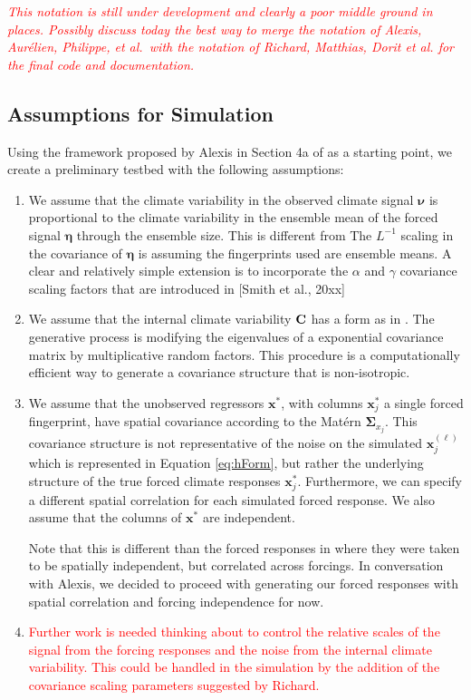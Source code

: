 \documentclass[12pt]{article}
\newcommand{\C}{\ensuremath{\text{Cov}}}
\def\*#1{\bm{#1}}
\def\C{\textbf{\text{C}}}
\begin{document}
\textcolor{red}{\emph{This notation is still under development and clearly a poor middle ground in places. Possibly discuss today the best way to merge the notation of Alexis, Aur\'elien, Philippe, et al.\ with the notation of Richard, Matthias, Dorit et al. for the final code and documentation.}}

\subsection{Assumptions for Simulation}
Using the framework proposed by Alexis in Section 4a of \cite{hannart16} as a starting point, we create a preliminary testbed with the following assumptions:
\begin{enumerate}[label={(\Roman*)}]
\item We assume that the climate variability in the observed climate signal $\*\nu$ is proportional to the climate variability in the ensemble mean of the forced signal $\*\eta$ through the ensemble size. This is different from  The $L^{-1}$ scaling in the covariance of $\*\eta$ is assuming the fingerprints used are ensemble means. A clear and relatively simple extension is to incorporate the $\alpha$ and $\gamma$ covariance scaling factors that are introduced in [Smith et al., 20xx]
\item We assume that the internal climate variability $\C$ has a form as in \cite{hannart16}. The generative process is modifying the eigenvalues of a exponential covariance matrix by multiplicative random factors. This procedure is a computationally efficient way to generate a covariance structure that is non-isotropic.
\item We assume that the unobserved regressors $\*x^*$, with columns $\*x^*_j$ a single forced fingerprint, have spatial covariance according to the Mat\'ern $\*\Sigma_{x_j}$. This covariance structure is not representative of the noise on the simulated $\*x_j^{(\ell)}$ which is represented in Equation \ref{eq:hForm}, but rather the underlying structure of the true forced climate responses $\*x^*_j$. Furthermore, we can specify a different spatial correlation for each simulated forced response. We also assume that the columns of $\*x^*$ are independent.

Note that this is different than the forced responses in \cite{hannart16} where they were taken to be spatially independent, but correlated across forcings. In conversation with Alexis, we decided to proceed with generating our forced responses with spatial correlation and forcing independence for now.

\item \textcolor{red}{Further work is needed thinking about to control the relative scales of the signal from the forcing responses and the noise from the internal climate variability. This could be handled in the simulation by the addition of the covariance scaling parameters suggested by Richard.}
\end{enumerate}
\end{document}

